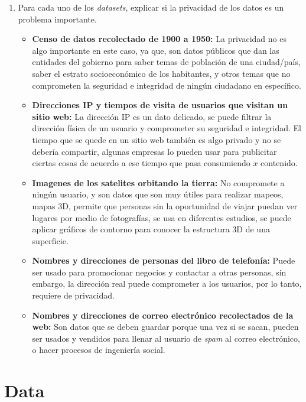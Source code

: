 \documentclass{article}
\begin{document}
\begin{enumerate}
\begin{itemize}
        \end{itemize}
  \item Para cada uno de los \textit{datasets}, explicar si la privacidad de los datos es un problema importante.
        \begin{itemize}
          \item \textbf{Censo de datos recolectado de 1900 a 1950:} La privacidad no es algo importante en este caso, ya que, son datos públicos que dan las entidades del gobierno para saber temas de población de una ciudad/país, saber el estrato socioeconómico de los habitantes, y otros temas que no comprometen la seguridad e integridad de ningún ciudadano en específico.
          \item \textbf{Direcciones IP y tiempos de visita de usuarios que visitan un sitio web:} La dirección IP es un dato delicado, se puede filtrar la dirección física de un usuario y comprometer su seguridad e integridad. El tiempo que se quede en un sitio web también es algo privado y no se debería compartir, algunas empresas lo pueden usar para publicitar ciertas cosas de acuerdo a ese tiempo que pasa consumiendo \(x\) contenido.
          \item \textbf{Imagenes de los satelites orbitando la tierra:} No compromete a ningún usuario, y son datos que son muy útiles para realizar mapeos, mapas 3D, permite que personas sin la oportunidad de viajar puedan ver lugares por medio de fotografías, se usa en diferentes estudios, se puede aplicar gráficos de contorno para conocer la estructura 3D de una superficie.
          \item \textbf{Nombres y direcciones de personas del libro de telefonía:} Puede ser usado para promocionar negocios y contactar a otras personas, sin embargo, la dirección real puede comprometer a los usuarios, por lo tanto, requiere de privacidad.
          \item \textbf{Nombres y direcciones de correo electrónico recolectados de la web:} Son datos que se deben guardar porque una vez si se sacan, pueden ser usados y vendidos para llenar al usuario de \textit{spam} al correo electrónico, o hacer procesos de ingeniería social.
        \end{itemize}
\end{enumerate}

\section{Data}
\end{document}
